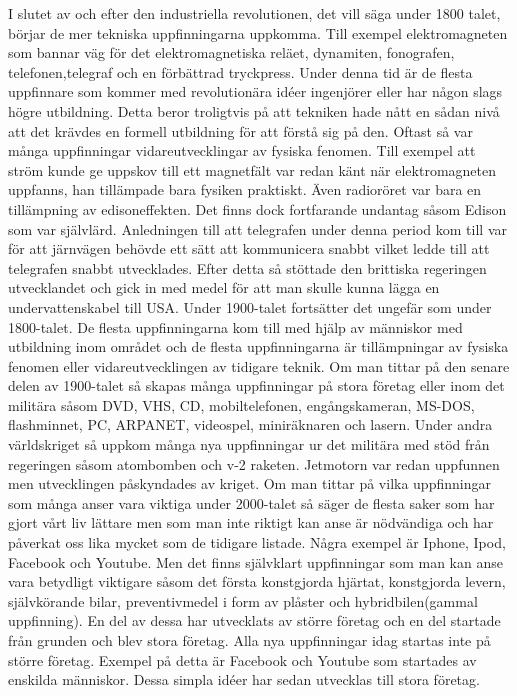 \documentclass[a4paper,12pt]{article}
\begin{document}
\newline
\newline
I slutet av och efter den industriella revolutionen, det vill säga under 1800 talet, börjar de mer tekniska uppfinningarna uppkomma. Till exempel elektromagneten som bannar väg för det elektromagnetiska reläet, dynamiten, fonografen, telefonen,telegraf och en förbättrad tryckpress. Under denna tid är de flesta uppfinnare som kommer med revolutionära idéer ingenjörer eller har någon slags högre utbildning. Detta beror troligtvis på att tekniken hade nått en sådan nivå att det krävdes en formell utbildning för att förstå sig på den. Oftast så var många uppfinningar vidareutvecklingar av fysiska fenomen. Till exempel att ström kunde ge uppskov till ett magnetfält var redan känt när elektromagneten uppfanns, han tillämpade bara fysiken praktiskt. Även radioröret var bara en tillämpning av edisoneffekten. Det finns dock fortfarande undantag såsom Edison som var självlärd. 
\newline
\newline
Anledningen till att telegrafen under denna period kom till var för att järnvägen behövde ett sätt att kommunicera snabbt vilket ledde till att telegrafen snabbt utvecklades. Efter detta så stöttade den brittiska regeringen utvecklandet och gick in med medel för att man skulle kunna lägga en undervattenskabel till USA.
\newline
\newline
Under 1900-talet fortsätter det ungefär som under 1800-talet. De flesta uppfinningarna kom till med hjälp av människor med utbildning inom området och de flesta uppfinningarna är tillämpningar av fysiska fenomen eller vidareutvecklingen av tidigare teknik. Om man tittar på den senare delen av 1900-talet så skapas många uppfinningar på stora företag eller inom det militära såsom DVD, VHS, CD, mobiltelefonen, engångskameran, MS-DOS, flashminnet, PC, ARPANET, videospel, miniräknaren och lasern. Under andra världskriget så uppkom många nya uppfinningar ur det militära med stöd från regeringen såsom atombomben och v-2 raketen. Jetmotorn var redan uppfunnen men utvecklingen påskyndades av kriget. 
\newline
\newline
Om man tittar på vilka uppfinningar som många anser vara viktiga under 2000-talet så säger de flesta saker som har gjort vårt liv lättare men som man inte riktigt kan anse är nödvändiga och har påverkat oss lika mycket som de tidigare listade. Några exempel är Iphone, Ipod, Facebook och Youtube. Men det finns självklart uppfinningar som man kan anse vara betydligt viktigare såsom det första konstgjorda hjärtat, konstgjorda levern, självkörande bilar, preventivmedel i form av plåster och hybridbilen(gammal uppfinning). En del av dessa har utvecklats av större företag och en del startade från grunden och blev stora företag. Alla nya uppfinningar idag startas inte på större företag. Exempel på detta är Facebook och Youtube som startades av enskilda människor. Dessa simpla idéer har sedan utvecklas till stora företag. 
\end{document}
